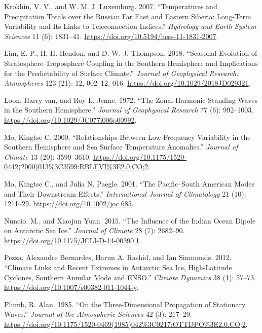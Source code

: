 \documentclass[smallextended]{svjour3}       %
\newlength{\cslhangindent}
\newlength{\cslentryspacingunit} %
\newenvironment{CSLReferences}[2] %
 {%
  \setlength{\parindent}{0pt}
  \ifodd #1
  \let\oldpar\par
  \def\par{\hangindent=\cslhangindent\oldpar}
  \fi
  \setlength{\parskip}{#2\cslentryspacingunit}
 }%
 {}
\begin{document}
\begin{CSLReferences}{1}{0}
\leavevmode{}%
Krokhin, V. V., and W. M. J. Luxemburg. 2007. {``Temperatures and Precipitation Totals over the {Russian Far East} and {Eastern Siberia}: Long-Term Variability and Its Links to Teleconnection Indices.''} \emph{Hydrology and Earth System Sciences} 11 (6): 1831--41. \url{https://doi.org/10.5194/hess-11-1831-2007}.

\leavevmode{}%
Lim, E.-P., H. H. Hendon, and D. W. J. Thompson. 2018. {``Seasonal {Evolution} of {Stratosphere-Troposphere Coupling} in the {Southern Hemisphere} and {Implications} for the {Predictability} of {Surface Climate}.''} \emph{Journal of Geophysical Research: Atmospheres} 123 (21): 12, 002--12, 016. \url{https://doi.org/10.1029/2018JD029321}.

\leavevmode{}%
Loon, Harry van, and Roy L. Jenne. 1972. {``The Zonal Harmonic Standing Waves in the Southern Hemisphere.''} \emph{Journal of Geophysical Research} 77 (6): 992--1003. \url{https://doi.org/10.1029/JC077i006p00992}.

\leavevmode{}%
Mo, Kingtse C. 2000. {``Relationships Between {Low-Frequency Variability} in the {Southern Hemisphere} and {Sea Surface Temperature Anomalies}.''} \emph{Journal of Climate} 13 (20): 3599--3610. \url{https://doi.org/10.1175/1520-0442(2000)013\%3C3599:RBLFVI\%3E2.0.CO;2}.

\leavevmode{}%
Mo, Kingtse C., and Julia N. Paegle. 2001. {``The {Pacific}--{South American} Modes and Their Downstream Effects.''} \emph{International Journal of Climatology} 21 (10): 1211--29. \url{https://doi.org/10.1002/joc.685}.

\leavevmode{}%
Nuncio, M., and Xiaojun Yuan. 2015. {``The {Influence} of the {Indian Ocean Dipole} on {Antarctic Sea Ice}.''} \emph{Journal of Climate} 28 (7): 2682--90. \url{https://doi.org/10.1175/JCLI-D-14-00390.1}.

\leavevmode{}%
Pezza, Alexandre Bernardes, Harun A. Rashid, and Ian Simmonds. 2012. {``Climate Links and Recent Extremes in Antarctic Sea Ice, High-Latitude Cyclones, {Southern Annular Mode} and {ENSO}.''} \emph{Climate Dynamics} 38 (1): 57--73. \url{https://doi.org/10.1007/s00382-011-1044-y}.

\leavevmode{}%
Plumb, R. Alan. 1985. {``On the {Three-Dimensional Propagation} of {Stationary Waves}.''} \emph{Journal of the Atmospheric Sciences} 42 (3): 217--29. \url{https://doi.org/10.1175/1520-0469(1985)042\%3C0217:OTTDPO\%3E2.0.CO;2}.


\end{CSLReferences}
\end{document}
